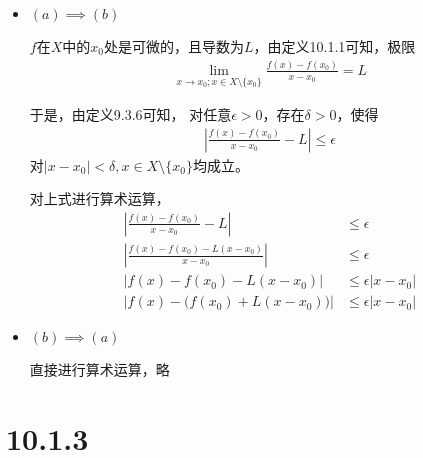 \documentclass{article}
\begin{document}
\begin{itemize}
  \item $(a) \implies (b)$

        $f$在$X$中的$x_0$处是可微的，且导数为$L$，由定义10.1.1可知，极限
        \begin{align*}
          \lim\limits_{x \to x_0; x \in X \setminus \{x_0\}} \frac{f(x) - f(x_0)}{x - x_0} = L
        \end{align*}

        于是，由定义9.3.6可知，
        对任意$\epsilon > 0$，存在$\delta > 0$，使得
        \begin{align*}
          |\frac{f(x) - f(x_0)}{x - x_0} - L | \leq \epsilon
        \end{align*}
        对$|x - x_0| < \delta, x \in X \setminus \{x_0\}$均成立。

        对上式进行算术运算，
        \begin{align*}
          |\frac{f(x) - f(x_0)}{x - x_0} - L |       & \leq \epsilon           \\
          |\frac{f(x) - f(x_0) - L(x-x_0)}{x - x_0}| & \leq \epsilon           \\
          |f(x) - f(x_0) - L(x-x_0)|                 & \leq \epsilon |x - x_0| \\
          |f(x) - \big( f(x_0) + L(x-x_0) \big)|     & \leq \epsilon |x - x_0|
        \end{align*}

  \item $(b) \implies (a)$
  
        直接进行算术运算，略
\end{itemize}

\section*{10.1.3}
\end{document}
